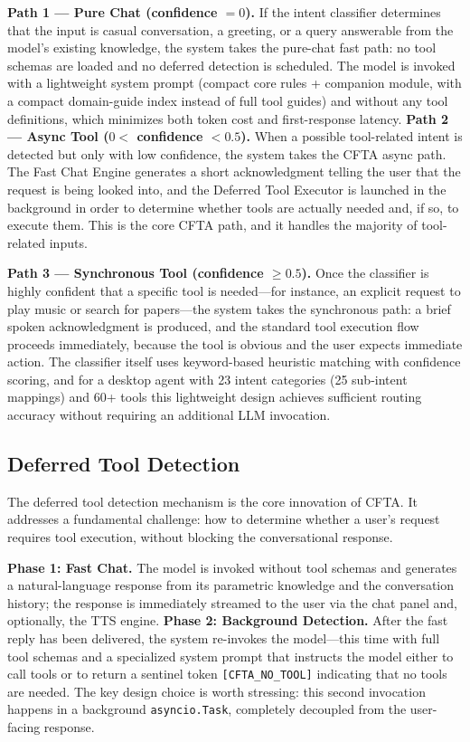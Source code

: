 \documentclass[numbered,mediumone,traditional]{oup-authoring-template}
\begin{document}
\textbf{Path 1 --- Pure Chat (confidence $= 0$).} If the intent classifier determines that the input is casual conversation, a greeting, or a query answerable from the model's existing knowledge, the system takes the pure-chat fast path: no tool schemas are loaded and no deferred detection is scheduled. The model is invoked with a lightweight system prompt (compact core rules + companion module, with a compact domain-guide index instead of full tool guides) and without any tool definitions, which minimizes both token cost and first-response latency. \textbf{Path 2 --- Async Tool ($0 <$ confidence $< 0.5$).} When a possible tool-related intent is detected but only with low confidence, the system takes the CFTA async path. The Fast Chat Engine generates a short acknowledgment telling the user that the request is being looked into, and the Deferred Tool Executor is launched in the background in order to determine whether tools are actually needed and, if so, to execute them. This is the core CFTA path, and it handles the majority of tool-related inputs.

\textbf{Path 3 --- Synchronous Tool (confidence $\geq 0.5$).} Once the classifier is highly confident that a specific tool is needed---for instance, an explicit request to play music or search for papers---the system takes the synchronous path: a brief spoken acknowledgment is produced, and the standard tool execution flow proceeds immediately, because the tool is obvious and the user expects immediate action. The classifier itself uses keyword-based heuristic matching with confidence scoring, and for a desktop agent with 23 intent categories (25 sub-intent mappings) and 60+ tools this lightweight design achieves sufficient routing accuracy without requiring an additional LLM invocation.

\subsection{Deferred Tool Detection}

The deferred tool detection mechanism is the core innovation of CFTA. It addresses a fundamental challenge: how to determine whether a user's request requires tool execution, without blocking the conversational response.

\textbf{Phase 1: Fast Chat.} The model is invoked without tool schemas and generates a natural-language response from its parametric knowledge and the conversation history; the response is immediately streamed to the user via the chat panel and, optionally, the TTS engine. \textbf{Phase 2: Background Detection.} After the fast reply has been delivered, the system re-invokes the model---this time with full tool schemas and a specialized system prompt that instructs the model either to call tools or to return a sentinel token \texttt{[CFTA\_NO\_TOOL]} indicating that no tools are needed. The key design choice is worth stressing: this second invocation happens in a background \texttt{asyncio.Task}, completely decoupled from the user-facing response.
\end{document}
